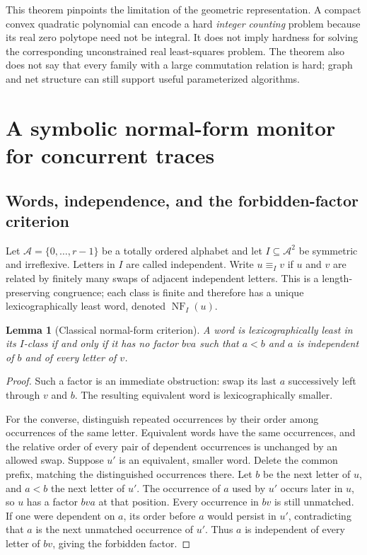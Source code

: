 \documentclass[11pt,a4paper]{article}
\newtheorem{lemma}[lemma]{Lemma}
\theoremstyle{definition}
\theoremstyle{remark}
\newcommand{\NF}{\operatorname{NF}}
\newcommand{\A}{\mathcal A}
\newcommand{\srctag}[1]{\texorpdfstring{\hspace{0.5em}{\normalfont\small\color{accent}[#1]}}{ [#1]}}
\begin{document}
This theorem pinpoints the limitation of the geometric representation. A compact convex quadratic polynomial can encode a hard \emph{integer counting} problem because its real zero polytope need not be integral. It does not imply hardness for solving the corresponding unconstrained real least-squares problem. The theorem also does not say that every family with a large commutation relation is hard; graph and net structure can still support useful parameterized algorithms.


\section{A symbolic normal-form monitor for concurrent traces\srctag{04}}\label{cdc:wf:sec:monitor}
\subsection{Words, independence, and the forbidden-factor criterion}
Let $\A=\{0,\ldots,r-1\}$ be a totally ordered alphabet and let $I\subseteq\A^2$ be symmetric and irreflexive. Letters in $I$ are called independent. Write $u\equiv_I v$ if $u$ and $v$ are related by finitely many swaps of adjacent independent letters. This is a length-preserving congruence; each class is finite and therefore has a unique lexicographically least word, denoted $\NF_I(u)$.

\begin{lemma}[Classical normal-form criterion]\label{cdc:wf:lem:forbidden}
A word is lexicographically least in its $I$-class if and only if it has no factor $bva$ such that $a<b$ and $a$ is independent of $b$ and of every letter of $v$.
\end{lemma}
\begin{proof}
Such a factor is an immediate obstruction: swap its last $a$ successively left through $v$ and $b$. The resulting equivalent word is lexicographically smaller.

For the converse, distinguish repeated occurrences by their order among occurrences of the same letter. Equivalent words have the same occurrences, and the relative order of every pair of dependent occurrences is unchanged by an allowed swap. Suppose $u'$ is an equivalent, smaller word. Delete the common prefix, matching the distinguished occurrences there. Let $b$ be the next letter of $u$, and $a<b$ the next letter of $u'$. The occurrence of $a$ used by $u'$ occurs later in $u$, so $u$ has a factor $bva$ at that position. Every occurrence in $bv$ is still unmatched. If one were dependent on $a$, its order before $a$ would persist in $u'$, contradicting that $a$ is the next unmatched occurrence of $u'$. Thus $a$ is independent of every letter of $bv$, giving the forbidden factor.
\end{proof}
\end{document}
